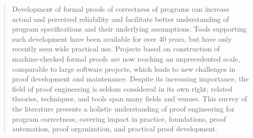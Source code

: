 \begin{abstract}
Development of formal proofs of correctness of programs can increase actual and perceived reliability and facilitate better understanding of program specifications and their underlying assumptions. Tools supporting such development have been available for over 40 years, but have only recently seen wide practical use. Projects based on construction of machine-checked formal proofs are now reaching an unprecedented scale, comparable to large software projects, which leads to new challenges in proof development and maintenance. Despite its increasing importance, the field of proof engineering is seldom considered in its own right; related theories, techniques, and tools span many fields and venues. This survey of the literature presents a holistic understanding of proof engineering for program correctness, covering impact in practice, foundations, proof automation, proof organization, and practical proof development.
\end{abstract}
